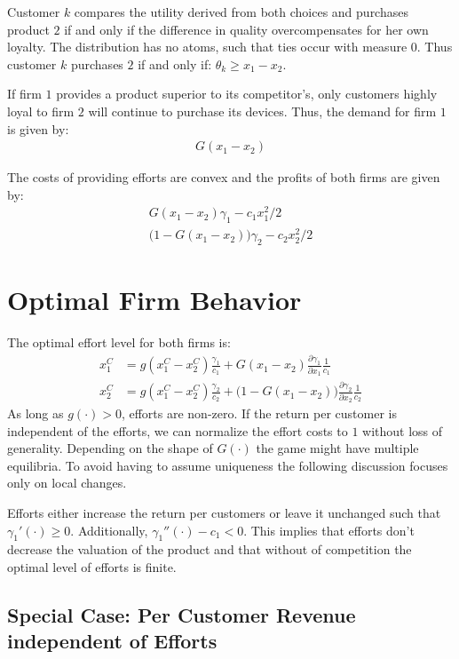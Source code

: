 \documentclass[a4paper, 11pt]{article}
\begin{document}
Customer $k$ compares the utility derived from both choices and purchases product $2$ if and only if the difference in quality overcompensates for her own loyalty. The distribution has no atoms, such that ties occur with measure $0$. Thus customer $k$ purchases $2$ if and only if:
$\theta_k\geq x_1-x_2$.

If firm $1$ provides a product superior to its competitor's, only customers highly loyal to firm $2$ will continue to purchase its devices. Thus, the demand for firm $1$ is given by:
\begin{align*}
G(x_1-x_2)
\end{align*}

The costs of providing efforts are convex and the profits of both firms are given by:
\begin{align}
G(x_1-x_2)\gamma_1 - c_1x_1^2/2\\
\big(1-G(x_1-x_2)\big)\gamma_2 - c_2x_2^2/2
\end{align}

\section{Optimal Firm Behavior}

The optimal effort level for both firms is:
\begin{align}
x_1^C &= g(x_1^C-x_2^C)\frac{\gamma_1}{c_1} + G(x_1-x_2)\frac{\partial \gamma_1}{\partial x_1}\frac{1}{c_1}\\
x_2^C &= g(x_1^C-x_2^C)\frac{\gamma_2}{c_2} + \big(1-G(x_1-x_2)\big)\frac{\partial \gamma_2}{\partial x_2}\frac{1}{c_2}
\end{align}
As long as $g(\cdot)>0$, efforts are non-zero. If the return per customer is independent of the efforts, we can normalize the effort costs to $1$ without loss of generality. Depending on the shape of $G(\cdot)$ the game might have multiple equilibria. To avoid having to assume uniqueness the following discussion focuses only on local changes. 

Efforts either increase the return per customers or leave it unchanged such that $\gamma_1'(\cdot)\geq 0$. Additionally, $\gamma_1''(\cdot) - c_1<0$. This implies that efforts don't decrease the valuation of the product and that without of competition the optimal level of efforts is finite.

\subsection{Special Case: Per Customer Revenue independent of Efforts}
\end{document}
